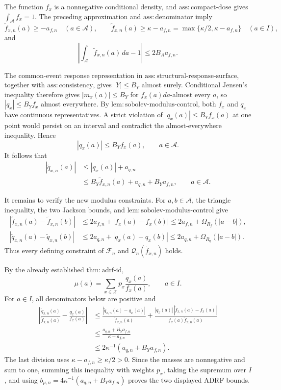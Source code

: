 The function \(f_x\) is a nonnegative conditional density, and \(\mathrm{ass{:}compact\text{-}dose}\) gives \(\int_{\mathcal A}f_x=1\). The preceding approximation and \(\mathrm{ass{:}denominator}\) imply
\[
 \widetilde f_{x,n}(a)\ge-a_{f,n}\quad(a\in\mathcal A),
 \qquad
 \widetilde f_{x,n}(a)\ge\kappa-a_{f,n}
 =\max\{\kappa/2,\kappa-a_{f,n}\}\quad(a\in I),
\]
and
\[
 \left|\int_{\mathcal A}\widetilde f_{x,n}(a)\,da-1\right|
 \le2B_Aa_{f,n}.
\]

The common-event response representation in \(\mathrm{ass{:}structural\text{-}response\text{-}surface}\), together with \(\mathrm{ass{:}consistency}\), gives \(|Y|\le B_Y\) almost surely. Conditional Jensen's inequality therefore gives \(|m_x(a)|\le B_Y\) for \(f_x(a)da\)-almost every \(a\), so \(|q_x|\le B_Yf_x\) almost everywhere. By \(\mathrm{lem{:}sobolev\text{-}modulus\text{-}control}\), both \(f_x\) and \(q_x\) have continuous representatives. A strict violation of \(|q_x(a)|\le B_Yf_x(a)\) at one point would persist on an interval and contradict the almost-everywhere inequality. Hence
\[
 |q_x(a)|\le B_Yf_x(a),\qquad a\in\mathcal A.
\]
It follows that
\[
 \begin{aligned}
 |\widetilde q_{x,n}(a)|
 &\le |q_x(a)|+a_{q,n}\\
 &\le B_Y\widetilde f_{x,n}(a)+a_{q,n}+B_Ya_{f,n},
 \qquad a\in\mathcal A.
 \end{aligned}
\]

It remains to verify the new modulus constraints. For \(a,b\in\mathcal A\), the triangle inequality, the two Jackson bounds, and \(\mathrm{lem{:}sobolev\text{-}modulus\text{-}control}\) give
\[
 \begin{aligned}
 |\widetilde f_{x,n}(a)-\widetilde f_{x,n}(b)|
 &\le 2a_{f,n}+|f_x(a)-f_x(b)|
 \le2a_{f,n}+\Omega_{R_f}(|a-b|),\\
 |\widetilde q_{x,n}(a)-\widetilde q_{x,n}(b)|
 &\le 2a_{q,n}+|q_x(a)-q_x(b)|
 \le2a_{q,n}+\Omega_{R_q}(|a-b|).
 \end{aligned}
\]
Thus every defining constraint of \(\mathscr F_n\) and \(\mathscr Q_n(\widetilde f_{x,n})\) holds.

By the already established \(\mathrm{thm{:}adrf\text{-}id}\),
\[
 \mu(a)=\sum_{x\in\mathcal X}p_x\frac{q_x(a)}{f_x(a)},
 \qquad a\in I.
\]
For \(a\in I\), all denominators below are positive and
\[
 \begin{aligned}
 \left|\frac{\widetilde q_{x,n}(a)}{\widetilde f_{x,n}(a)}
       -\frac{q_x(a)}{f_x(a)}\right|
 &\le
 \frac{|\widetilde q_{x,n}(a)-q_x(a)|}{\widetilde f_{x,n}(a)}
 +\frac{|q_x(a)|\,|\widetilde f_{x,n}(a)-f_x(a)|}
 {f_x(a)\widetilde f_{x,n}(a)}\\
 &\le\frac{a_{q,n}+B_Ya_{f,n}}{\kappa-a_{f,n}}\\
 &\le2\kappa^{-1}(a_{q,n}+B_Ya_{f,n}).
 \end{aligned}
\]
The last division uses \(\kappa-a_{f,n}\ge\kappa/2>0\). Since the masses are nonnegative and sum to one, summing this inequality with weights \(p_x\), taking the supremum over \(I\), and using \(b_{\mu,n}=4\kappa^{-1}(a_{q,n}+B_Ya_{f,n})\) proves the two displayed ADRF bounds.

